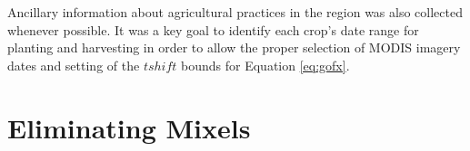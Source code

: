 Ancillary information about agricultural practices in the region was also collected whenever possible. It was a key goal to identify each crop's date range for planting and harvesting in order to allow the proper selection of MODIS imagery dates and setting of the $tshift$ bounds for Equation \ref{eq:gofx}.

\section{Eliminating Mixels}































